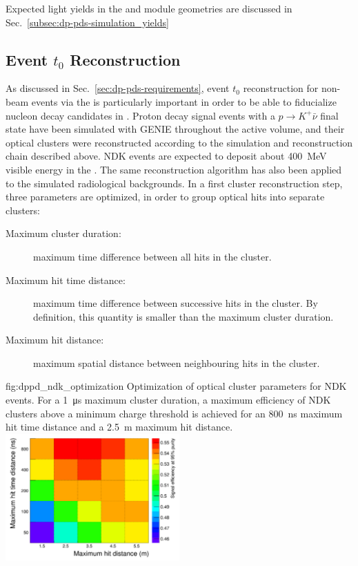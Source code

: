 
Expected  light yields in the  and   module geometries are discussed in Sec.~\ref{subsec:dp-pds-simulation_yields}


\subsection{Event $t_{0}$ Reconstruction}
\label{subsec:dp-pds-performance_t0}

As discussed in Sec.~\ref{sec:dp-pds-requirements}, event $t_0$ reconstruction for non-beam events via the  is particularly important in order to be able to fiducialize nucleon decay candidates in . Proton decay signal events with a %
$p\rightarrow K^{+} \bar\nu$ final state have been simulated with GENIE \cite{Andreopoulos:2009rq} throughout the   active volume, and their optical clusters were reconstructed according to the simulation and reconstruction chain described above. NDK events are expected to deposit about \SI{400}{\MeV} visible energy in the \lar. The same reconstruction algorithm has also been applied to the simulated radiological backgrounds. In a first cluster reconstruction step, three parameters are optimized, in order to group optical hits into separate clusters:
%
\begin{description}
\item[Maximum cluster duration:] maximum time difference between all  hits in the cluster.
\item[Maximum hit time distance:] maximum time difference between successive  hits in the cluster. By definition, this quantity is smaller than the maximum cluster duration.
\item[Maximum hit distance:] maximum spatial distance between neighbouring  hits in the cluster. 
\end{description}
%
\begin{dunefigure}{fig:dppd_ndk_optimization}
     {Optimization of optical cluster parameters for NDK events. For a \SI{1}{\us} maximum cluster duration, a maximum efficiency of NDK clusters above a minimum charge threshold is achieved for an \SI{800}{\ns} maximum hit time distance and a \SI{2.5}{\m} maximum hit distance.}
    \includegraphics[width=0.5\textwidth]{graphics/dppd_ndk_optimization.pdf}
    \end{dunefigure}

